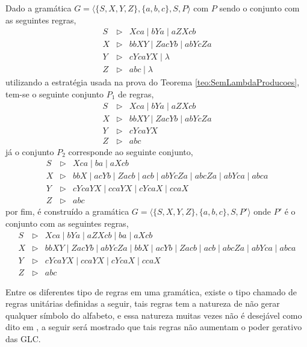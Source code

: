 \begin{example}
    Dado a gramática $G = \langle \{S, X, Y, Z\}, \{a, b, c\}, S, P \rangle$ com $P$ sendo o conjunto com as seguintes regras,
    \begin{eqnarray*}
        S & \rhd & Xca \mid bYa \mid aZXcb \\
        X & \rhd & bbXY \mid ZacYb \mid abYcZa \\
        Y & \rhd & cYcaYX \mid \lambda\\
        Z & \rhd & abc \mid \lambda
    \end{eqnarray*}
    utilizando a estratégia usada na prova do Teorema \ref{teo:SemLambdaProducoes}, tem-se o seguinte conjunto $P_1$ de regras, 
    \begin{eqnarray*}
        S & \rhd & Xca \mid bYa \mid aZXcb \\
        X & \rhd & bbXY \mid ZacYb \mid abYcZa \\
        Y & \rhd & cYcaYX\\
        Z & \rhd & abc
    \end{eqnarray*}
    já o conjunto $P_2$ corresponde ao seguinte conjunto,
    \begin{eqnarray*}
        S & \rhd & Xca \mid ba \mid aXcb \\
        X & \rhd & bbX \mid acYb \mid Zacb \mid acb \mid abYcZa \mid abcZa \mid abYca \mid abca \\
        Y & \rhd & cYcaYX \mid ccaYX \mid cYcaX \mid ccaX \\
        Z & \rhd & abc
    \end{eqnarray*}
    por fim, é construído a gramática  $G = \langle \{S, X, Y, Z\}, \{a, b, c\}, S, P' \rangle$ onde $P'$ é o conjunto com as seguintes regras,
    \begin{eqnarray*}
        S & \rhd & Xca \mid bYa \mid aZXcb \mid ba \mid aXcb \\
        X & \rhd & bbXY \mid ZacYb \mid abYcZa \mid bbX \mid acYb \mid Zacb \mid acb \mid abcZa \mid abYca \mid abca  \\
        Y & \rhd & cYcaYX \mid ccaYX \mid cYcaX \mid ccaX  \\
        Z & \rhd & abc
    \end{eqnarray*}
\end{example}

Entre os diferentes tipo de regras em uma gramática, existe o tipo chamado de regras unitárias definidas a seguir, tais regras tem a natureza de não gerar qualquer símbolo do alfabeto, e essa natureza muitas vezes não é desejável como dito em \cite{benjaLivro2010}, a seguir será mostrado que tais regras não aumentam o poder gerativo das GLC.

